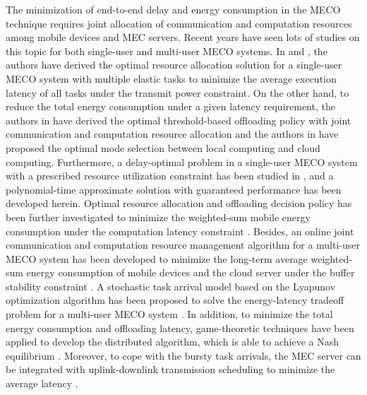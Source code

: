 \documentclass[journal,draftcls,onecolumn,12pt,twoside]{IEEEtran}
\begin{document}
The minimization of end-to-end delay and energy consumption in the MECO technique requires joint allocation of communication and computation resources among mobile devices and MEC servers. Recent years have seen lots of studies on this topic for both single-user \cite{Single_user_1,Single_user_2,Single_user_3,Single_user_4,Single_user_5,MCC_energy,MEC_Partial_computation_offloading,Energy_MCC_stochastic_channel} and multi-user \cite{Multi_user_1,Multi_user_2,Multi_user_3,Multi_user_4,Multi_user_5, Multi_cell} MECO systems. In \cite{Single_user_1} and \cite{Single_user_2}, the authors have derived the optimal resource allocation solution for a single-user MECO system with multiple elastic tasks to minimize the average execution latency of all tasks under the transmit power constraint. On the other hand, to reduce the total energy consumption under a given latency requirement, the authors in \cite{Single_user_3} have derived the optimal threshold-based offloading policy with joint communication and computation resource allocation and the authors in \cite{Single_user_4} have proposed the optimal mode selection between local computing and cloud computing. Furthermore, a delay-optimal problem in a single-user MECO system with a prescribed resource utilization constraint has been studied in \cite{Single_user_5}, and a polynomial-time approximate solution with guaranteed performance has been developed herein. Optimal resource allocation and offloading decision policy has been further investigated to minimize the weighted-sum mobile energy consumption under the computation latency constraint \cite{Multi_user_1}. Besides, an online joint communication and computation resource management algorithm for a multi-user MECO system has been developed to minimize the long-term average weighted-sum energy consumption of mobile devices and the cloud server under the buffer stability constraint \cite{Multi_user_2}. A stochastic task arrival model based on the Lyapunov optimization algorithm has been proposed to solve the energy-latency tradeoff problem for a multi-user MECO system \cite{Multi_user_3}. In addition, to minimize the total energy consumption and offloading latency, game-theoretic techniques have been applied to develop the distributed algorithm, which is able to achieve a Nash equilibrium \cite{Multi_user_4}. Moreover, to cope with the bursty task arrivals, the MEC server can be integrated with uplink-downlink transmission scheduling to minimize the average latency \cite{Multi_user_5}.
\end{document}

